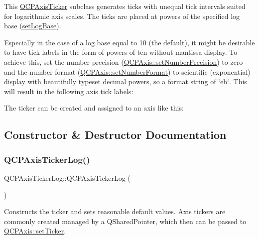This \mbox{\hyperlink{class_q_c_p_axis_ticker}{Q\+C\+P\+Axis\+Ticker}} subclass generates ticks with unequal tick intervals suited for logarithmic axis scales. The ticks are placed at powers of the specified log base (\mbox{\hyperlink{class_q_c_p_axis_ticker_log_ac6e3b4e03baea3816f898869ab9751ef}{set\+Log\+Base}}).

Especially in the case of a log base equal to 10 (the default), it might be desirable to have tick labels in the form of powers of ten without mantissa display. To achieve this, set the number precision (\mbox{\hyperlink{class_q_c_p_axis_a21dc8023ad7500382ad9574b48137e63}{Q\+C\+P\+Axis\+::set\+Number\+Precision}}) to zero and the number format (\mbox{\hyperlink{class_q_c_p_axis_ae585a54dc2aac662e90a2ca82f002590}{Q\+C\+P\+Axis\+::set\+Number\+Format}}) to scientific (exponential) display with beautifully typeset decimal powers, so a format string of {\ttfamily \char`\"{}eb\char`\"{}}. This will result in the following axis tick labels\+:



The ticker can be created and assigned to an axis like this\+: 
\begin{DoxyCodeInclude}{0}
\end{DoxyCodeInclude}


\subsection{Constructor \& Destructor Documentation}
\mbox{\label{class_q_c_p_axis_ticker_log_af3cb86ea5eef2023c0b96b5260c4cbdf}} 
\subsubsection{\texorpdfstring{QCPAxisTickerLog()}{QCPAxisTickerLog()}}
{\footnotesize\ttfamily Q\+C\+P\+Axis\+Ticker\+Log\+::\+Q\+C\+P\+Axis\+Ticker\+Log (\begin{DoxyParamCaption}{ }\end{DoxyParamCaption})}

Constructs the ticker and sets reasonable default values. Axis tickers are commonly created managed by a Q\+Shared\+Pointer, which then can be passed to \mbox{\hyperlink{class_q_c_p_axis_a4ee03fcd2c74d05cd1a419b9af5cfbdc}{Q\+C\+P\+Axis\+::set\+Ticker}}. 

